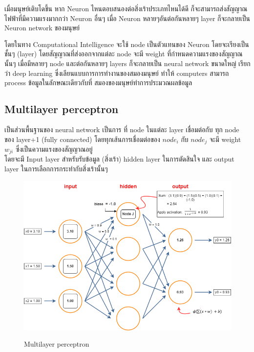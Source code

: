 เมื่อมนุษย์เติบโดขึ้น หาก Neuron ไหนตอบสนองต่อสิ่งเร้าประเภทไหนได้ดี ก็จะสามารถส่งสัญญาณไฟฟ้าที่มีความแรงมากกว่า Neuron อื่นๆ
เมื่อ Neuron หลายๆอันต่อกันหลายๆ layer ก็จะกลายเป็น Neuron network ของมนุษย์

โดยในทาง  Computational Intelligence จะใช้ node เป็นตัวแทนของ Neuron โดยจะเรียงเป็นชั้นๆ (layer)
โดยสัญญาณที่ส่งออกจากแต่ละ node จะมี weight ที่กำหนดความแรงของสัญญาณนั้นๆ เมื่อมีหลายๆ node และต่อกันหลายๆ layers
ก็จะกลายเป็น neural network ขนาดใหญ่ เรียกว่า deep learning ซึ่งเลียนแบบการการทำงานของสมองมนุษย์
ทำให้  computers สามารถ process ข้อมูลในลักษณะเดียวกับที่ สมองของมนุษย์ทำการประมวณผลข้อมูล

\subsection{Multilayer perceptron \cite{Mlp}}
เป็นส่วนพื้นฐานของ neural network เป็นการ ที่ node ในแต่ละ layer เชื่อมต่อกับ ทุก node ของ layer+1 (fully connected)
โดยทุกเส้นการเชื่อมต่อของ $node_i$  กับ $node_j$ จะมี weight $w_{ji}$  ซึ่งเป็นความแรงของสัญญาณอยู่
\\ โดยจะมี Input layer สำหรับรับข้อมูล (สิ่งเร้า) hidden layer ในการตัดสินใจ และ output layer ในการเลือกการกระทำกับสิ่งเร้านั้นๆ
\begin{figure}[h]
  \begin{center}

    \includegraphics[scale=0.3]{pic/model/mlp_1.png}\cite{NeuralNetwork}
  \end{center}
  \caption[Multilayer perceptron]{Multilayer perceptron}
  \label{fig:Multilayer perceptron}
\end{figure}

